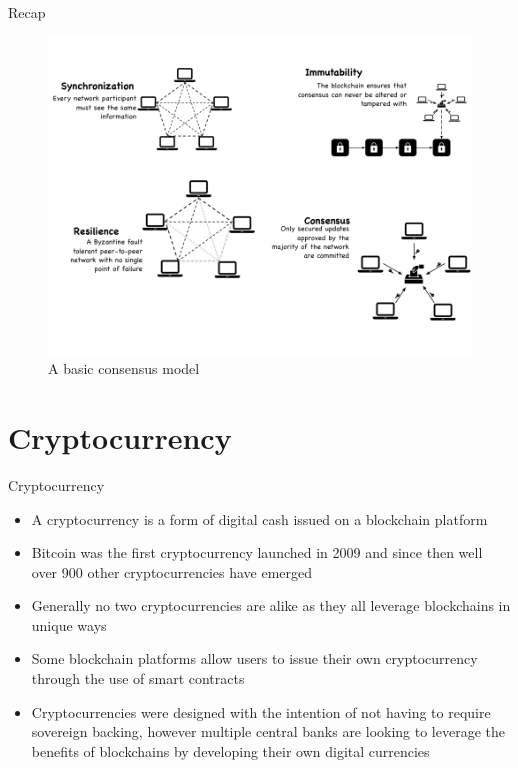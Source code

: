 \documentclass[9pt]{beamer}
\begin{document}

\begin{frame}{Recap}
	\begin{figure}[]
		\centering
		\includegraphics  [scale=0.3]{Images/consensus}
		\caption{A basic consensus model}
	\end{figure}
\end{frame}


\section{Cryptocurrency}

\begin{frame}
	\begin{center}
		\begin{large}
			Cryptocurrency
		\end{large}
	\end{center}
\end{frame}



\begin{frame}{}
	\begin{itemize}
		\item A cryptocurrency is a form of digital cash issued on a blockchain platform
		\item Bitcoin was the first cryptocurrency launched in 2009 and since then well over 900 other cryptocurrencies have emerged
		\item Generally no two cryptocurrencies are alike as they all leverage blockchains in unique ways
		\item Some blockchain platforms allow users to issue their own cryptocurrency through the use of smart contracts
		\item Cryptocurrencies were designed with the intention of not having to require sovereign backing, however multiple central banks are looking to leverage the benefits of blockchains by developing their own digital currencies
	\end{itemize}
\end{frame}
\end{document}
